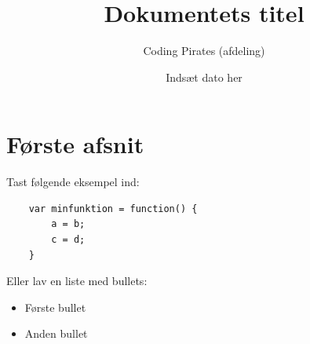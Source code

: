 \documentclass[oneside,a4paper]{scrartcl}
\title{Dokumentets titel}
\author{\sffamily Coding Pirates (afdeling)}
\date{\sffamily Indsæt dato her}
\begin{document}
\maketitle
\thispagestyle{cptitle}



\section{Første afsnit}
Tast følgende eksempel ind:
\begin{lstlisting}
    var minfunktion = function() {
    	a = b;
    	c = d;
    }
\end{lstlisting}
Eller lav en liste med bullets:
\begin{itemize}
	\item Første bullet
	\item Anden bullet
\end{itemize}
\end{document}
